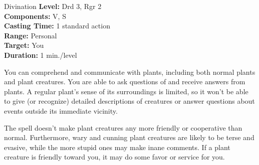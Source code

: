 {Divination}
{
	\textbf{Level:}
	Drd 3, Rgr 2\\
	\textbf{Components:}
	V, S\\
	\textbf{Casting Time:}
	1 standard action\\
	\textbf{Range:}
	Personal\\
	\textbf{Target:}
	You\\
	\textbf{Duration:}
	1 min./level\\
}
{
	You can comprehend and communicate with plants, including both normal plants and plant creatures. You are able to ask questions of and receive answers from plants. A regular plant's sense of its surroundings is limited, so it won't be able to give (or recognize) detailed descriptions of creatures or answer questions about events outside its immediate vicinity.

	The spell doesn't make plant creatures any more friendly or cooperative than normal. Furthermore, wary and cunning plant creatures are likely to be terse and evasive, while the more stupid ones may make inane comments. If a plant creature is friendly toward you, it may do some favor or service for you.

}
